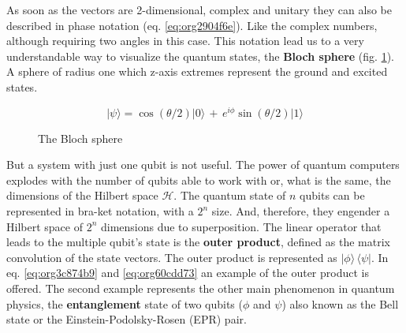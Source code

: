 \begin{itemize}
As soon as the vectors are 2-dimensional, complex and unitary they can also be described in phase notation (eq. \ref{eq:org2904f6e}).
Like the complex numbers, although requiring two angles in this case.
This notation lead us to a very understandable way to visualize the quantum states, the \textbf{Bloch sphere} (fig. \ref{fig:bloch_sphere}).
A sphere of radius one which z-axis extremes represent the ground and excited states.

\begin{equation}
\label{eq:org2904f6e}
|\psi \rangle =\cos \left(\theta /2\right)|0\rangle \,+\,e^{i\phi }\sin \left(\theta /2\right)|1\rangle
\end{equation}

\begin{figure}
\centering
{}
\caption{The Bloch sphere}
\label{fig:bloch_sphere}
\end{figure}

But a system with just one qubit is not useful.
The power of quantum computers explodes with the number of qubits able to work with or, what is the same, the dimensions of the Hilbert space \(\mathscr{H}\).
The quantum state of \(n\) qubits can be represented in bra-ket notation, with a \(2^n\) size.
And, therefore, they engender a Hilbert space of \(2^n\) dimensions due to superposition.
The linear operator that leads to the multiple qubit's state is the \textbf{outer product}, defined as the matrix convolution of the state vectors.
The outer product is represented as \(|\phi \rangle \,\langle \psi |\).
In eq. \ref{eq:org3c874b9} and \ref{eq:org60cdd73} an example of the outer product is offered.
The second example represents the other main phenomenon in quantum physics, the \textbf{entanglement} state of two qubits (\(\phi\) and \(\psi\)) also known as the Bell state or the Einstein-Podolsky-Rosen (EPR) pair.


\end{itemize}
